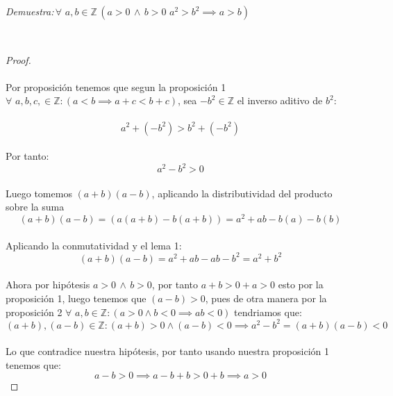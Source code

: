 \documentclass[11pt,letterpaper]{article}
\newcommand{\Z}{\mathbb{Z}}
\begin{document}
\begin{tcolorbox}[
	title = \textcolor{black}{\textcolor{white}{Problema 4}},]
\textit{Demuestra:\,$\forall\,\,a,b\in \Z\,(a>0\,\land\,b>0\,\,a^2>b^2 \implies a>b)$
}
\end{tcolorbox}\,\\
\begin{proof}\,\\
    \,\\
    Por proposici\'on tenemos que segun la proposici\'on 1 $\forall\,\,a,b,c,\in \Z:(a<b\implies a+c<b+c)$, sea $-b^2\in \Z$
    el inverso aditivo de $b^2$:\,\\
    \,\\
    \begin{equation*}
        a^2+(-b^2)>b^2+(-b^2)
    \end{equation*}\,\\
    Por tanto:\,\\
    \begin{equation*}
        a^2-b^2>0
    \end{equation*}\,\\
    Luego tomemos $(a+b)(a-b)$, aplicando la distributividad del producto sobre la suma\,\\
    \begin{equation*}
        (a+b)(a-b)=(a(a+b)-b(a+b))=a^2+ab-b(a)-b(b)
    \end{equation*}\,\\
    Aplicando la conmutatividad y el lema 1:\,\\
    \begin{equation*}
        (a+b)(a-b)=a^2+ab-ab-b^2=a^2+b^2
    \end{equation*}\,\\
    Ahora por hip\'otesis $a>0\,\land\,b>0$, por tanto $a+b>0+a>0$ esto por la proposici\'on 1, luego tenemos que
    $(a-b)>0$, pues de otra manera por la proposici\'on 2 $\forall\,\,a,b\in \Z:(a>0\land b<0\implies ab<0)$ tendriamos que:\,\\
    \begin{equation*}
        (a+b),(a-b)\in \Z: (a+b)>0 \land (a-b)<0 \implies a^2-b^2=(a+b)(a-b)<0
    \end{equation*}\,\\
    Lo que contradice nuestra hip\'otesis, por tanto usando nuestra proposici\'on 1 tenemos que:\,\\
    \begin{equation*}
        a-b>0\implies a-b+b>0+b \implies a>0
    \end{equation*}
\end{proof}\,\\
\end{document}
